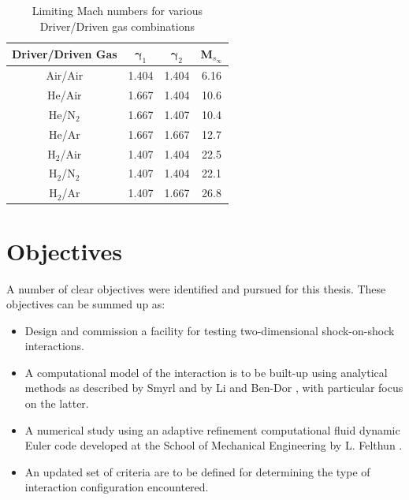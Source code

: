 \begin{table}[htb]
\caption{Limiting Mach numbers for various Driver/Driven gas combinations %
\protect\cite{Knuth1968}} \label{tab:1table1}
\centering
\begin{tabular}{|c|c|c|c|}
\hline
\textbf{Driver/Driven Gas} & $\mathbf{\gamma }_1$ & $\mathbf{\gamma }_2$ & 
\textbf{M}$_{s_\infty }$ \\ \hline
Air/Air & 1.404 & 1.404 & 6.16 \\ \hline
He/Air & 1.667 & 1.404 & 10.6 \\ \hline
He/N$_2$ & 1.667 & 1.407 & 10.4 \\ \hline
He/Ar & 1.667 & 1.667 & 12.7 \\ \hline
H$_2$/Air & 1.407 & 1.404 & 22.5 \\ \hline
H$_2$/N$_2$ & 1.407 & 1.404 & 22.1 \\ \hline
H$_2$/Ar & 1.407 & 1.667 & 26.8 \\ \hline
\end{tabular}
\end{table}

\section{Objectives} \label{sec:1sec7}

A number of clear objectives were identified and pursued for this thesis. These objectives can
be summed up as:
\begin{itemize}
\item  Design and commission a facility for testing two-dimensional shock-on-shock
interactions.
\item  A computational model of the interaction is to be built-up using analytical methods as
described by Smyrl \cite{Knuth1968} and by Li and Ben-Dor \cite{Knuth1968}, with particular focus on
the latter.
\item  A numerical study using an adaptive refinement computational fluid dynamic Euler code
developed at the School of Mechanical Engineering by L. Felthun \cite{Knuth1968}.
\item  An updated set of criteria are to be defined for determining the type of interaction
configuration encountered.
\end{itemize}